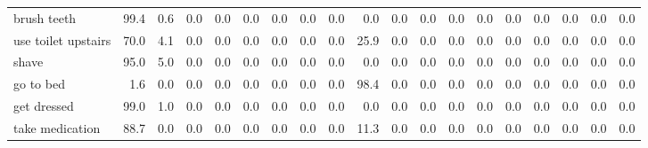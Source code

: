 \documentclass{article}
\begin{document}
\begin{sideways}
\begin{tabular}{lrrrrrrrrrrrrrrrrrr}
brush teeth                   &        99.4 &                0.6 &           0.0 &                          0.0 &                0.0 &                0.0 &                        0.0 &          0.0 &              0.0 &                0.0 &                    0.0 &                      0.0 &                  0.0 &                   0.0 &              0.0 &              0.0 &                                  0.0 &          0.0 \\
use toilet upstairs           &        70.0 &                4.1 &           0.0 &                          0.0 &                0.0 &                0.0 &                        0.0 &          0.0 &             25.9 &                0.0 &                    0.0 &                      0.0 &                  0.0 &                   0.0 &              0.0 &              0.0 &                                  0.0 &          0.0 \\
shave                         &        95.0 &                5.0 &           0.0 &                          0.0 &                0.0 &                0.0 &                        0.0 &          0.0 &              0.0 &                0.0 &                    0.0 &                      0.0 &                  0.0 &                   0.0 &              0.0 &              0.0 &                                  0.0 &          0.0 \\
go to bed                     &         1.6 &                0.0 &           0.0 &                          0.0 &                0.0 &                0.0 &                        0.0 &          0.0 &             98.4 &                0.0 &                    0.0 &                      0.0 &                  0.0 &                   0.0 &              0.0 &              0.0 &                                  0.0 &          0.0 \\
get dressed                   &        99.0 &                1.0 &           0.0 &                          0.0 &                0.0 &                0.0 &                        0.0 &          0.0 &              0.0 &                0.0 &                    0.0 &                      0.0 &                  0.0 &                   0.0 &              0.0 &              0.0 &                                  0.0 &          0.0 \\
take medication               &        88.7 &                0.0 &           0.0 &                          0.0 &                0.0 &                0.0 &                        0.0 &          0.0 &             11.3 &                0.0 &                    0.0 &                      0.0 &                  0.0 &                   0.0 &              0.0 &              0.0 &                                  0.0 &          0.0 \\

\end{tabular}
\end{sideways}
\end{document}
